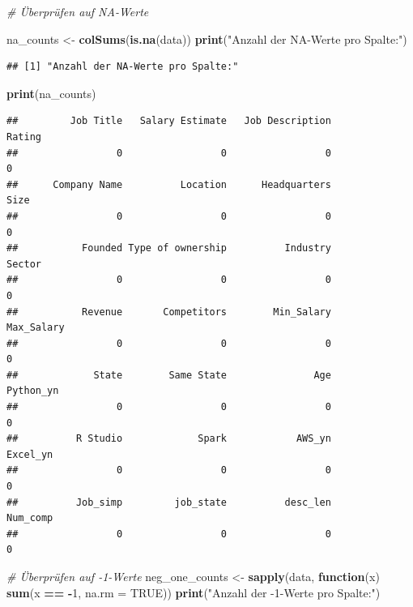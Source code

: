 \documentclass[
]{article}
\newenvironment{Shaded}{\begin{snugshade}}{\end{snugshade}}
\newcommand{\AttributeTok}[1]{\textcolor[rgb]{0.13,0.29,0.53}{#1}}
\newcommand{\CommentTok}[1]{\textcolor[rgb]{0.56,0.35,0.01}{\textit{#1}}}
\newcommand{\ConstantTok}[1]{\textcolor[rgb]{0.56,0.35,0.01}{#1}}
\newcommand{\ControlFlowTok}[1]{\textcolor[rgb]{0.13,0.29,0.53}{\textbf{#1}}}
\newcommand{\DecValTok}[1]{\textcolor[rgb]{0.00,0.00,0.81}{#1}}
\newcommand{\FunctionTok}[1]{\textcolor[rgb]{0.13,0.29,0.53}{\textbf{#1}}}
\newcommand{\NormalTok}[1]{#1}
\newcommand{\OtherTok}[1]{\textcolor[rgb]{0.56,0.35,0.01}{#1}}
\newcommand{\SpecialCharTok}[1]{\textcolor[rgb]{0.81,0.36,0.00}{\textbf{#1}}}
\newcommand{\StringTok}[1]{\textcolor[rgb]{0.31,0.60,0.02}{#1}}
\begin{document}
\begin{Shaded}
\begin{Highlighting}[]
\CommentTok{\# Überprüfen auf NA{-}Werte}

\NormalTok{na\_counts }\OtherTok{\textless{}{-}} \FunctionTok{colSums}\NormalTok{(}\FunctionTok{is.na}\NormalTok{(data))}
\FunctionTok{print}\NormalTok{(}\StringTok{"Anzahl der NA{-}Werte pro Spalte:"}\NormalTok{)}
\end{Highlighting}
\end{Shaded}

\begin{verbatim}
## [1] "Anzahl der NA-Werte pro Spalte:"
\end{verbatim}

\begin{Shaded}
\begin{Highlighting}[]
\FunctionTok{print}\NormalTok{(na\_counts)}
\end{Highlighting}
\end{Shaded}

\begin{verbatim}
##         Job Title   Salary Estimate   Job Description            Rating 
##                 0                 0                 0                 0 
##      Company Name          Location      Headquarters              Size 
##                 0                 0                 0                 0 
##           Founded Type of ownership          Industry            Sector 
##                 0                 0                 0                 0 
##           Revenue       Competitors        Min_Salary        Max_Salary 
##                 0                 0                 0                 0 
##             State        Same State               Age         Python_yn 
##                 0                 0                 0                 0 
##          R Studio             Spark            AWS_yn          Excel_yn 
##                 0                 0                 0                 0 
##          Job_simp         job_state          desc_len          Num_comp 
##                 0                 0                 0                 0
\end{verbatim}

\begin{Shaded}
\begin{Highlighting}[]
\CommentTok{\# Überprüfen auf {-}1{-}Werte}
\NormalTok{neg\_one\_counts }\OtherTok{\textless{}{-}} \FunctionTok{sapply}\NormalTok{(data, }\ControlFlowTok{function}\NormalTok{(x) }\FunctionTok{sum}\NormalTok{(x }\SpecialCharTok{==} \SpecialCharTok{{-}}\DecValTok{1}\NormalTok{, }\AttributeTok{na.rm =} \ConstantTok{TRUE}\NormalTok{))}
\FunctionTok{print}\NormalTok{(}\StringTok{"Anzahl der {-}1{-}Werte pro Spalte:"}\NormalTok{)}
\end{Highlighting}
\end{Shaded}
\end{document}
